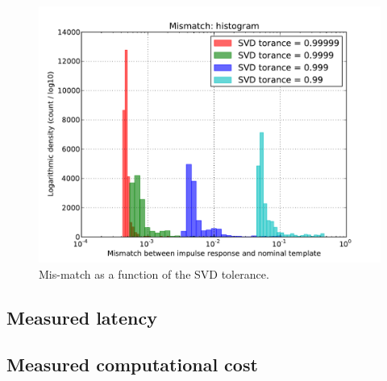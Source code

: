 \begin{figure}
\includegraphics{hist.pdf}
\caption{\label{fig:hist}Mis-match as a function of the SVD tolerance.}
\end{figure}


\subsection{Measured latency}

\subsection{Measured computational cost}



